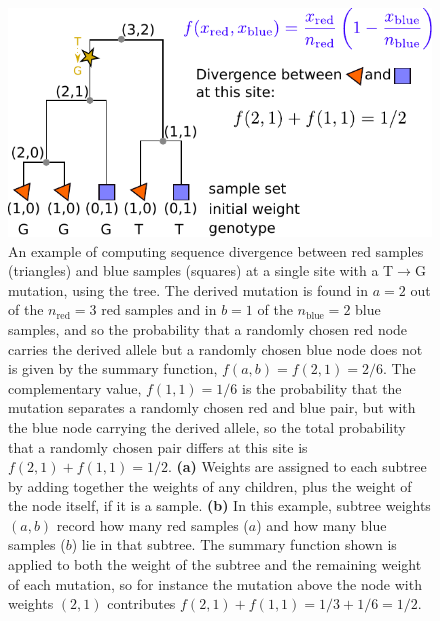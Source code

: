 \documentclass{article}
\begin{document}
\begin{figure}
    \begin{center}
    \includegraphics{figures/divergence_diagram_simple}
    \end{center}
    \caption{
        An example of computing sequence divergence
        between red samples (triangles) and blue samples (squares)
        at a single site with a T$\to$G mutation, using the tree.
        The derived mutation is found in $a=2$ out of the $n_\text{red} = 3$ red samples
        and in $b=1$ of the $n_\text{blue}=2$ blue samples, and so the probability that a randomly chosen red node carries the derived allele
        but a randomly chosen blue node does not
        is given by the summary function, $f(a,b) = f(2, 1) = 2/6$.
        The complementary value, $f(1, 1) = 1/6$ is the probability that the mutation separates
        a randomly chosen red and blue pair, but with the blue node carrying the derived allele,
        so the total probability that a randomly chosen pair
        differs at this site is $f(2,1) + f(1,1) = 1/2$.
        \textbf{(a)} Weights are assigned to each subtree by adding together the weights of any children,
        plus the weight of the node itself, if it is a sample.
        \textbf{(b)} In this example, subtree weights $(a,b)$ record how many red samples ($a$)
        and how many blue samples ($b$) lie in that subtree.
        The summary function shown is applied to both the weight of the subtree
        and the remaining weight of each mutation,
        so for instance the mutation above the node with weights $(2,1)$
        contributes $f(2,1) + f(1,1) = 1/3 + 1/6 = 1/2$.
        \label{fig:divergence_diagram}
    }
\end{figure}
\end{document}

